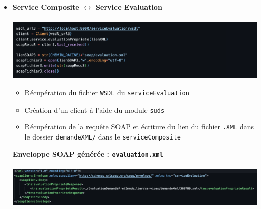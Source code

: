 \documentclass{article}
\begin{document}
\begin{itemize}
          
          \item \textbf{Service Composite $\leftrightarrow$ Service Evaluation} \\ \\
          \includegraphics[width=\textwidth]{Images/7.3/wsdlEvaluation.png}\\
          \begin{itemize}
              \item Récupération du fichier \texttt{WSDL} du \texttt{serviceEvaluation}
              \item Création d'un client à l'aide du module \texttt{suds}
              \item Récupération de la requête SOAP et écriture du lien du fichier \texttt{.XML} dans le dossier \texttt{demandeXML/} dans le \texttt{serviceComposite}
          \end{itemize}
          \textbf{Enveloppe SOAP générée : \texttt{evaluation.xml}}\\ \\
          \includegraphics[width=\textwidth]{Images/7.3/SOAPEvaluation.png}
          

\end{itemize}
\end{document}

